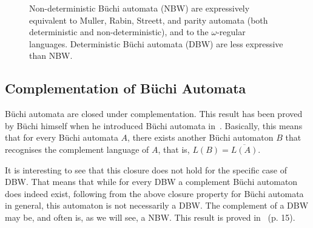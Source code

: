\documentclass[a4paper]{report}
\newcommand{\om}{{$\omega$}}
\begin{document}
\begin{figure}[htb]
\begin{center}
\caption{Non-deterministic Büchi automata (NBW) are expressively equivalent to Muller, Rabin, Streett, and parity automata (both deterministic and non-deterministic), and to the \om-regular languages. Deterministic Büchi automata (DBW) are less expressive than NBW.}
\label{equivalences}
\end{center}
\end{figure}


\subsection{Complementation of Büchi Automata}
\label{intro:complementation}
Büchi automata are closed under complementation. This result has been proved by Büchi himself when he introduced Büchi automata in~\cite{buchi1960decision}. Basically, this means that for every Büchi automata $A$, there exists another Büchi automaton $B$ that recognises the complement language of $A$, that is, $L(B) = \overline{L(A)}$.

It is interesting to see that this closure does not hold for the specific case of DBW. That means that while for every DBW a complement Büchi automaton does indeed exist, following from the above closure property for Büchi automata in general, this automaton is not necessarily a DBW. The complement of a DBW may be, and often is, as we will see, a NBW. This result is proved in~\cite{Thomas:1991} (p. 15).
\end{document}
